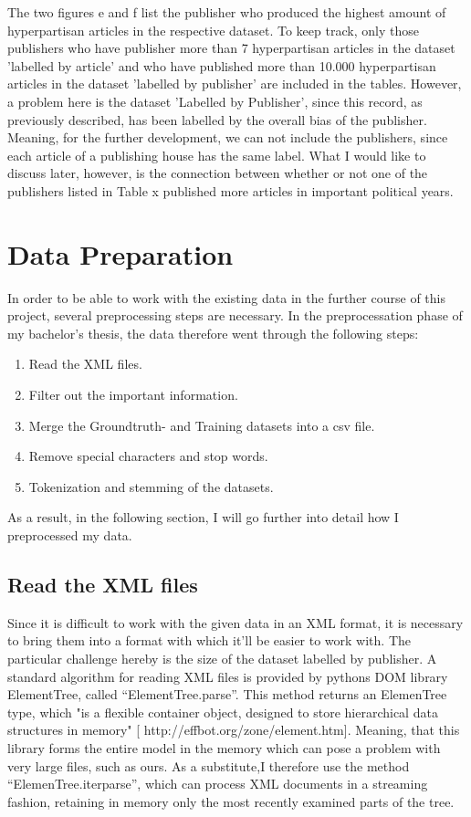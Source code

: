 \documentclass[11pt,titlepage,oneside,openany]{book}
\begin{document}
\noindent The two figures e and f list the publisher who produced the highest amount of hyperpartisan articles in the respective dataset. To keep track, only those publishers who have publisher more than 7 hyperpartisan articles in the dataset 'labelled by article' and who have published more than 10.000 hyperpartisan articles in the dataset 'labelled by publisher' are included in the tables. However, a problem here is the dataset 'Labelled by Publisher', since this record, as previously described, has been labelled by the overall bias of the publisher. Meaning, for the further development, we can not include the publishers, since each article of a publishing house has the same label. What I would like to discuss later, however, is the connection between whether or not one of the publishers listed in Table x published more articles in important political years.


\section{Data Preparation}
In order to be able to work with the existing data in the further course of this project, several preprocessing steps are necessary. In the preprocessation phase of my bachelor's thesis, the data therefore went through the following steps:
\begin{enumerate}
	\item Read the XML files. 
	\item Filter out the important information.
	\item Merge the Groundtruth- and Training datasets into a csv file.
	\item Remove special characters and stop words.
	\item Tokenization and stemming of the datasets.
\end{enumerate}	
\noindent As a result, in the following section, I will go further into detail how I preprocessed my data.


\subsection{Read the XML files}
Since it is difficult to work with the given data in an XML format, it is necessary to bring them into a format with which it’ll be easier to work with. The particular challenge hereby is the size of the dataset labelled by publisher. A standard algorithm for reading XML files is provided by pythons DOM library ElementTree, called “ElementTree.parse”. This method returns an ElemenTree type, which "is a flexible container object, designed to store hierarchical data structures in memory" [ http://effbot.org/zone/element.htm]. Meaning, that this library forms the entire model in the memory which can pose a problem with very large files, such as ours. As a substitute,I therefore use the method “ElemenTree.iterparse”, which can process XML documents in a streaming fashion, retaining in memory only the most recently examined parts of the tree. 
\end{document}
